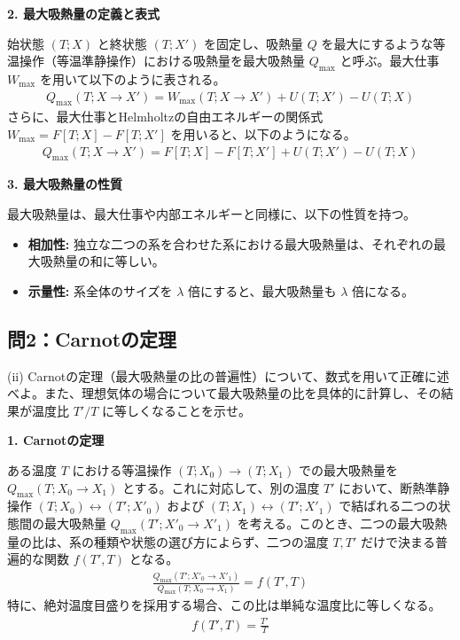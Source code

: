 \documentclass[a4paper,12pt]{jlreq}
\begin{document}
\textbf{2. 最大吸熱量の定義と表式} \par
始状態 $(T; X)$ と終状態 $(T; X')$ を固定し、吸熱量 $Q$ を最大にするような等温操作（等温準静操作）における吸熱量を最大吸熱量 $Q_{\max}$ と呼ぶ。最大仕事 $W_{\max}$ を用いて以下のように表される。
\begin{align}
  Q_{\max}(T; X \to X') = W_{\max}(T; X \to X') + U(T; X') - U(T; X)
\end{align}
さらに、最大仕事とHelmholtzの自由エネルギーの関係式 $W_{\max} = F[T; X] - F[T; X']$ を用いると、以下のようになる。
\begin{align}
  Q_{\max}(T; X \to X') = F[T; X] - F[T; X'] + U(T; X') - U(T; X)
\end{align}

\textbf{3. 最大吸熱量の性質} \par
最大吸熱量は、最大仕事や内部エネルギーと同様に、以下の性質を持つ。
\begin{itemize}
  \item \textbf{相加性:} 独立な二つの系を合わせた系における最大吸熱量は、それぞれの最大吸熱量の和に等しい。
  \item \textbf{示量性:} 系全体のサイズを $\lambda$ 倍にすると、最大吸熱量も $\lambda$ 倍になる。
\end{itemize}

\vspace{10mm}

\subsection*{問2：Carnotの定理}

\begin{itembox}[l]{(ii)}
  Carnotの定理（最大吸熱量の比の普遍性）について、数式を用いて正確に述べよ。また、理想気体の場合について最大吸熱量の比を具体的に計算し、その結果が温度比 $T'/T$ に等しくなることを示せ。
\end{itembox}

\vspace{5mm}

\par
\textbf{1. Carnotの定理} \par
ある温度 $T$ における等温操作 $(T; X_0) \to (T; X_1)$ での最大吸熱量を $Q_{\max}(T; X_0 \to X_1)$ とする。これに対応して、別の温度 $T'$ において、断熱準静操作 $(T; X_0) \leftrightarrow (T'; X'_0)$ および $(T; X_1) \leftrightarrow (T'; X'_1)$ で結ばれる二つの状態間の最大吸熱量 $Q_{\max}(T'; X'_0 \to X'_1)$ を考える。このとき、二つの最大吸熱量の比は、系の種類や状態の選び方によらず、二つの温度 $T, T'$ だけで決まる普遍的な関数 $f(T', T)$ となる。
\begin{align}
  \frac{Q_{\max}(T'; X'_0 \to X'_1)}{Q_{\max}(T; X_0 \to X_1)} = f(T', T)
\end{align}
特に、絶対温度目盛りを採用する場合、この比は単純な温度比に等しくなる。
\begin{align}
  f(T', T) = \frac{T'}{T}
\end{align}
\end{document}
